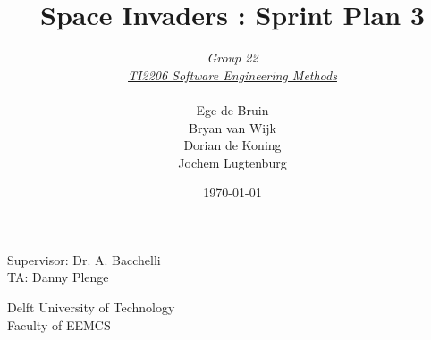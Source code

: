 \documentclass[10pt]{article}
\begin{document}
\title{Space Invaders : Sprint Plan 3}
\date{\today}
\author{\textit{Group 22}\\ \textit{\underline{TI2206 Software Engineering Methods}} \\
 \\Ege de Bruin \\ Bryan van Wijk \\ Dorian de Koning \\ Jochem Lugtenburg }
 \maketitle  
 \begin{center}
Supervisor: Dr. A. Bacchelli\\
TA: Danny Plenge\\
 \end{center}     
 \begin{center}
 Delft University of Technology\\
 Faculty of EEMCS\\
 \end{center}
 \thispagestyle{empty}
 \pagebreak
 
\end{document}
